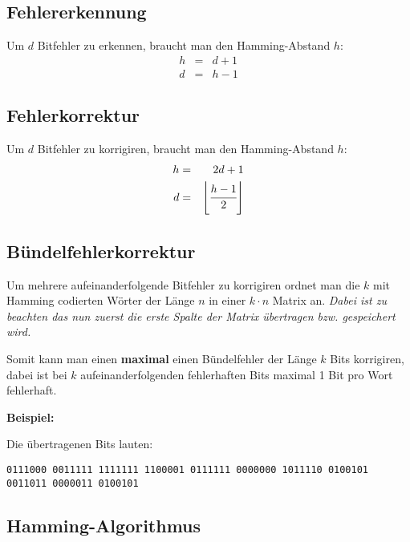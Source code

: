 \documentclass
[
	8pt,		%
	ngerman,	%
	a4paper,	%
	landscape,	%
	final		%
]{extarticle}
\newcommand*\example{\par\vspace{\abovedisplayskip}\textbf{Beispiel:}\par}
\newcommand{\includefigure}[1]{\begin{center}\end{center}}
\begin{document}
\begin{multicols*}{4}
\subsection{Fehlererkennung}
Um $d$ Bitfehler zu erkennen, braucht man den Hamming-Abstand $h$:
\begin{eqnarray*}
	h &=& d + 1 \\
	d &=& h - 1
\end{eqnarray*}
\subsection{Fehlerkorrektur}
Um $d$ Bitfehler zu korrigiren, braucht man den Hamming-Abstand $h$:
\begin{eqnarray*}
	h &=& 2d + 1 \\
	d &=& \left\lfloor\cfrac{h - 1}{2}\right\rfloor
\end{eqnarray*}
\subsection{Bündelfehlerkorrektur}
Um mehrere aufeinanderfolgende Bitfehler zu korrigiren ordnet man die $k$ mit Hamming
codierten Wörter der Länge $n$ in einer $k \cdot n$ Matrix an. \emph{Dabei ist zu
	beachten das nun zuerst die erste Spalte der Matrix übertragen bzw. gespeichert wird.}\par
Somit kann man einen \textbf{maximal} einen Bündelfehler der Länge $k$ Bits korrigiren,
dabei ist bei $k$ aufeinanderfolgenden fehlerhaften Bits maximal 1 Bit pro Wort fehlerhaft.

\example
\includefigure{./Documents/Graphics/Hamming-Abbildung-1.tex}
Die übertragenen Bits lauten:\par
\texttt{0111000 0011111 1111111 1100001 0111111 0000000 1011110 0100101 0011011 0000011 0100101}
\subsection{Hamming-Algorithmus}

\end{multicols*}
\end{document}
